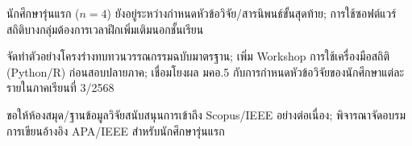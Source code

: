 \documentclass{mko5}
\begin{document}
\closummaryend

\closummaryend

\closummaryend

\mkosectionfour
\begin{mkotextblock}
นักศึกษารุ่นแรก ($n=4$) ยังอยู่ระหว่างกำหนดหัวข้อวิจัย/สารนิพนธ์ขั้นสุดท้าย;
การใช้ซอฟต์แวร์สถิติบางกลุ่มต้องการเวลาฝึกเพิ่มเติมนอกชั้นเรียน
\end{mkotextblock}

\mkosectionfive
\begin{mkotextblock}
จัดทำตัวอย่างโครงร่างทบทวนวรรณกรรมฉบับมาตรฐาน;
เพิ่ม Workshop การใช้เครื่องมือสถิติ (Python/R) ก่อนสอบปลายภาค;
เชื่อมโยงผล มคอ.5 กับการกำหนดหัวข้อวิจัยของนักศึกษาแต่ละรายในภาคเรียนที่ 3/2568
\end{mkotextblock}

\mkosectionsix
\begin{mkotextblock}
ขอให้ห้องสมุด/ฐานข้อมูลวิจัยสนับสนุนการเข้าถึง Scopus/IEEE อย่างต่อเนื่อง;
พิจารณาจัดอบรมการเขียนอ้างอิง APA/IEEE สำหรับนักศึกษารุ่นแรก
\end{mkotextblock}

\mkosectionseven
{}
\end{document}
